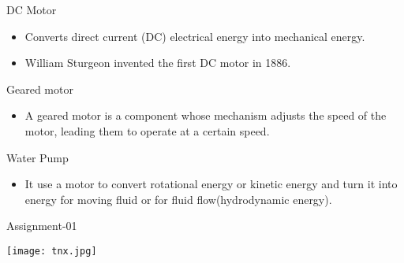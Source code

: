 \documentclass[10pt]{beamer}
\begin{document}
\begin{frame}{DC Motor}
\begin{itemize}
    \item Converts direct
current (DC)
electrical energy into
mechanical energy.
\item William Sturgeon
invented the first DC
motor in 1886.
\end{itemize}
    
\end{frame}
\begin{frame}{Geared motor}
    \begin{itemize}
        \item A geared motor is a
component whose
mechanism adjusts
the speed of the
motor, leading them
to operate at a
certain speed.
    \end{itemize}
\end{frame}
\begin{frame}{Water Pump}
\begin{itemize}
    \item It use a motor to
convert rotational
energy or kinetic energy
and turn it into energy
for moving fluid or for
fluid flow(hydrodynamic
energy).
\end{itemize}
    
\end{frame}

\begin{frame}{Assignment-01}
\begin{center}
       \texttt{[image: tnx.jpg]}
\end{center}
  
\end{frame}
\end{document}
